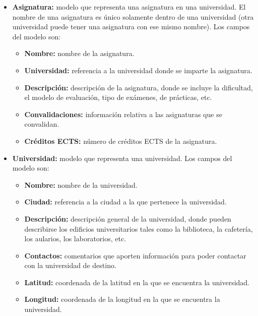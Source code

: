 \documentclass[a4paper, 12pt]{book}
\begin{document}
\begin{itemize}
    \item \textbf{Asignatura:} modelo que representa una asignatura en una universidad. El nombre de una asignatura es único solamente dentro de una universidad (otra universidad puede tener una asignatura con ese mismo nombre). Los campos del modelo son:
    \begin{itemize}
        \item \textbf{Nombre:} nombre de la asignatura.
        \item \textbf{Universidad:} referencia a la universidad donde se imparte la asignatura.
        \item \textbf{Descripción:} descripción de la asignatura, donde se incluye la dificultad, el modelo de evaluación, tipo de exámenes, de prácticas, etc.
        \item \textbf{Convalidaciones:} información relativa a las asignaturas que se convalidan.
        \item \textbf{Créditos ECTS:} número de créditos ECTS de la asignatura.
    \end{itemize}

    \item \textbf{Universidad:} modelo que representa una universidad. Los campos del modelo son:
    \begin{itemize}
        \item \textbf{Nombre:} nombre de la universidad.
        \item \textbf{Ciudad:} referencia a la ciudad a la que pertenece la universidad.
        \item \textbf{Descripción:} descripción general de la universidad, donde pueden describirse los edificios universitarios tales como la biblioteca, la cafetería, los aularios, los laboratorios, etc.
        \item \textbf{Contactos:} comentarios que aporten información para poder contactar con la universidad de destino.
        \item \textbf{Latitud:} coordenada de la latitud en la que se encuentra la universidad.
        \item \textbf{Longitud:} coordenada de la longitud en la que se encuentra la universidad.
    \end{itemize}


\end{itemize}
\end{document}
